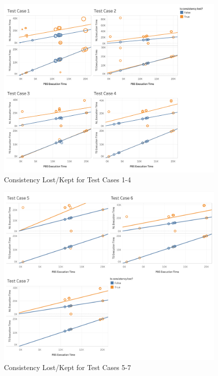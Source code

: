 \begin{figure}
\centering
\includegraphics[scale=0.25]{images/Dashboard1_TL.png}
\caption{Consistency Lost/Kept for Test Cases 1-4}
\label{results:consistency_test_case_graphs_1_4}
\end{figure}

\begin{figure}
\centering
\includegraphics[scale=0.40]{images/Dashboard2_TL.png}
\caption{Consistency Lost/Kept for Test Cases 5-7}
\label{results:consistency_test_case_graphs_5_7}
\end{figure}